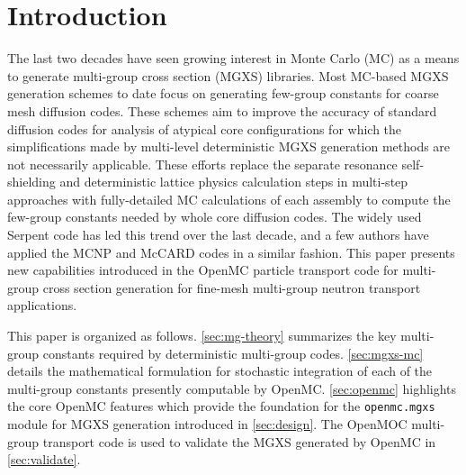\section{Introduction}
\label{sec:intro}

The last two decades have seen growing interest in Monte Carlo (MC) as a means to generate multi-group cross section (MGXS) libraries. Most MC-based MGXS generation schemes to date focus on generating few-group constants for coarse mesh diffusion codes. These schemes aim to improve the accuracy of standard diffusion codes for analysis of atypical core configurations for which the simplifications made by multi-level deterministic MGXS generation methods are not necessarily applicable. These efforts replace the separate resonance self-shielding and deterministic lattice physics calculation steps in multi-step approaches with fully-detailed MC calculations of each assembly to compute the few-group constants needed by whole core diffusion codes. The widely used Serpent code\cite{leppanen2015serpent} has led this trend over the last decade, and a few authors have applied the MCNP\cite{pounders2006stochastically} and McCARD\cite{shim2008generation} codes in a similar fashion. This paper presents new capabilities introduced in the OpenMC\cite{romano2015openmc} particle transport code for multi-group cross section generation for fine-mesh multi-group neutron transport applications.

This paper is organized as follows. \cref{sec:mg-theory} summarizes the key multi-group constants required by deterministic multi-group codes. \cref{sec:mgxs-mc} details the mathematical formulation for stochastic integration of each of the multi-group constants presently computable by OpenMC. \cref{sec:openmc} highlights the core OpenMC features which provide the foundation for the \texttt{openmc.mgxs} module for MGXS generation introduced in \cref{sec:design}. The OpenMOC\cite{boyd2014openmoc} multi-group transport code is used to validate the MGXS generated by OpenMC in \cref{sec:validate}.
